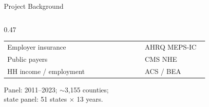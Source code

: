 \documentclass[aspectratio=169,11pt]{beamer}
\newcommand{\graytext}[1]{{\color{WarmGray}#1}}
\begin{document}
\begin{frame}{Project Background}
\begin{columns}[T]
\begin{column}{0.47\textwidth}
\begin{tabular}{@{}>{\raggedright\arraybackslash}p{0.56\linewidth}>{\raggedright\arraybackslash}p{0.26\linewidth}@{}}
        Employer insurance       & AHRQ MEPS-IC \\
        Public payers            & CMS NHE \\
        HH income / employment   & ACS / BEA \\
        \bottomrule
      \end{tabular}
      \vspace{0.35em}
      \graytext{\scriptsize Panel: 2011--2023; $\sim$3,155 counties;\\ state panel: 51 states $\times$ 13 years.}
    \end{column}
  \end{columns}
\end{frame}

\end{document}

